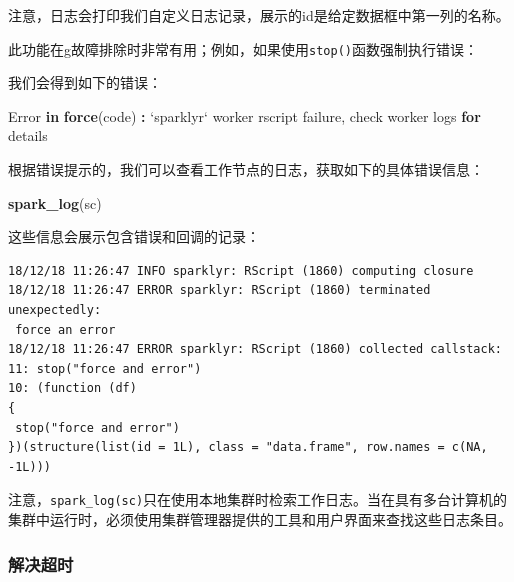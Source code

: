 \documentclass[
]{article}
\newenvironment{Shaded}{\begin{snugshade}}{\end{snugshade}}
\newcommand{\ControlFlowTok}[1]{\textcolor[rgb]{0.13,0.29,0.53}{\textbf{#1}}}
\newcommand{\DataTypeTok}[1]{\textcolor[rgb]{0.13,0.29,0.53}{#1}}
\newcommand{\DecValTok}[1]{\textcolor[rgb]{0.00,0.00,0.81}{#1}}
\newcommand{\KeywordTok}[1]{\textcolor[rgb]{0.13,0.29,0.53}{\textbf{#1}}}
\newcommand{\NormalTok}[1]{#1}
\newcommand{\OperatorTok}[1]{\textcolor[rgb]{0.81,0.36,0.00}{\textbf{#1}}}
\newcommand{\StringTok}[1]{\textcolor[rgb]{0.31,0.60,0.02}{#1}}
\begin{document}
注意，日志会打印我们自定义日志记录，展示的id是给定数据框中第一列的名称。

此功能在g故障排除时非常有用；例如，如果使用\texttt{stop()}函数强制执行错误：

\begin{Shaded}
\end{Shaded}

我们会得到如下的错误：

\begin{Shaded}
\begin{Highlighting}[]
\NormalTok{ Error }\ControlFlowTok{in} \KeywordTok{force}\NormalTok{(code) }\OperatorTok{:}
\StringTok{ `}\DataTypeTok{sparklyr}\StringTok{`}\NormalTok{ worker rscript failure, check worker logs }\ControlFlowTok{for}\NormalTok{ details}
\end{Highlighting}
\end{Shaded}

根据错误提示的，我们可以查看工作节点的日志，获取如下的具体错误信息：

\begin{Shaded}
\begin{Highlighting}[]
\KeywordTok{spark_log}\NormalTok{(sc)}
\end{Highlighting}
\end{Shaded}

这些信息会展示包含错误和回调的记录：

\begin{verbatim}
18/12/18 11:26:47 INFO sparklyr: RScript (1860) computing closure
18/12/18 11:26:47 ERROR sparklyr: RScript (1860) terminated unexpectedly:
 force an error
18/12/18 11:26:47 ERROR sparklyr: RScript (1860) collected callstack:
11: stop("force and error")
10: (function (df)
{
 stop("force and error")
})(structure(list(id = 1L), class = "data.frame", row.names = c(NA,
-1L)))
\end{verbatim}

注意，\texttt{spark\_log(sc)}只在使用本地集群时检索工作日志。当在具有多台计算机的集群中运行时，必须使用集群管理器提供的工具和用户界面来查找这些日志条目。

\hypertarget{ux89e3ux51b3ux8d85ux65f6}{%
\subsubsection{解决超时}\label{ux89e3ux51b3ux8d85ux65f6}}
\end{document}
